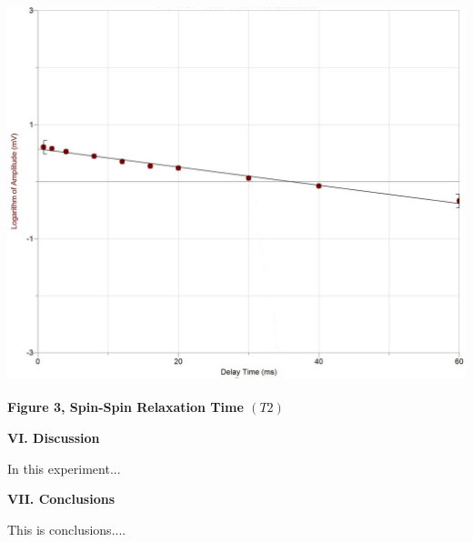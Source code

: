 \documentclass[fleqn]{article}
\begin{document}
  \pagebreak

  \includegraphics[height=11cm, width=16cm]{Fig3.JPG}

  \textbf{Figure 3, Spin-Spin Relaxation Time $(T2)$}

  \pagebreak


  \textbf{VI. Discussion}

  \vspace{10px}

  In this experiment...
  
  \vspace{20px}


  \textbf{VII. Conclusions}

  \vspace{10px}

  This is conclusions....
  
  \vspace{20px}


  \printbibliography
\end{document}
